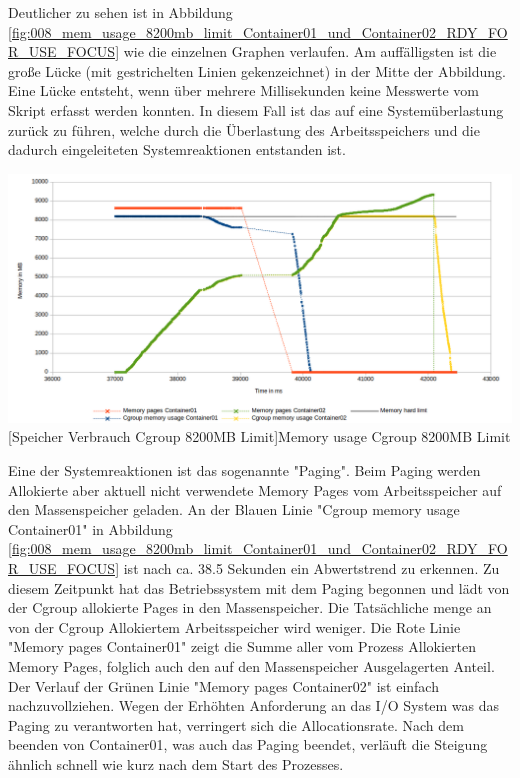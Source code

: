 Deutlicher zu sehen ist in Abbildung \ref{fig:008_mem_usage_8200mb_limit_Container01_und_Container02_RDY_FOR_USE_FOCUS} wie die einzelnen Graphen verlaufen. Am auffälligsten ist die große Lücke (mit gestrichelten Linien gekenzeichnet) in der Mitte der Abbildung. Eine Lücke entsteht, wenn über mehrere Millisekunden keine Messwerte vom Skript erfasst werden konnten. In diesem Fall ist das auf eine Systemüberlastung zurück zu führen, welche durch die Überlastung des Arbeitsspeichers und die dadurch eingeleiteten Systemreaktionen entstanden ist. 

\vspace{1em}
\begin{minipage}{\linewidth}
	\centering
	\includegraphics[width=1\linewidth]{pics/008_mem_usage_8200mb_limit_Container01_und_Container02_RDY_FOR_USE_FOCUS.png}
	[Speicher Verbrauch Cgroup 8200MB Limit]{Memory usage Cgroup 8200MB Limit}
	\label{fig:008_mem_usage_8200mb_limit_Container01_und_Container02_RDY_FOR_USE_FOCUS}
\end{minipage}



Eine der Systemreaktionen ist das sogenannte "Paging". Beim Paging werden Allokierte aber aktuell nicht verwendete Memory Pages vom Arbeitsspeicher auf den Massenspeicher geladen. An der Blauen Linie "Cgroup memory usage Container01" in Abbildung \ref{fig:008_mem_usage_8200mb_limit_Container01_und_Container02_RDY_FOR_USE_FOCUS} ist nach ca. 38.5 Sekunden ein Abwertstrend zu erkennen. Zu diesem Zeitpunkt hat das Betriebssystem mit dem Paging begonnen und lädt von der Cgroup allokierte Pages in den Massenspeicher. Die Tatsächliche menge an von der Cgroup Allokiertem Arbeitsspeicher wird weniger. Die Rote Linie "Memory pages Container01" zeigt die Summe aller vom Prozess Allokierten Memory Pages, folglich auch den auf den Massenspeicher Ausgelagerten Anteil. Der Verlauf der Grünen Linie "Memory pages Container02" ist einfach nachzuvollziehen. Wegen der Erhöhten Anforderung an das I/O System was das Paging zu verantworten hat, verringert sich die Allocationsrate. Nach dem beenden von Container01, was auch das Paging beendet, verläuft die Steigung ähnlich schnell wie kurz nach dem Start des Prozesses. 

